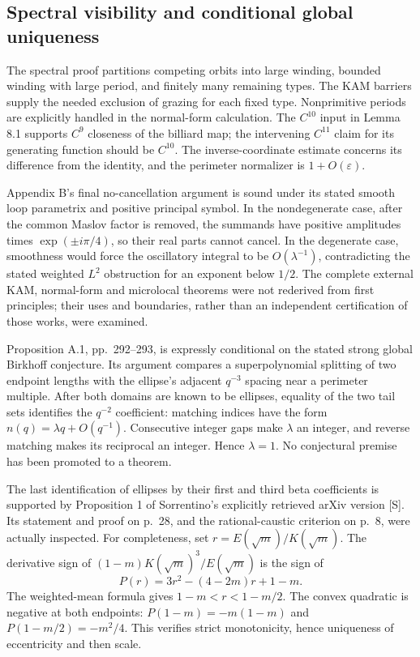 \documentclass[10pt]{article}
\begin{document}
\subsection*{Spectral visibility and conditional global uniqueness}
The spectral proof partitions competing orbits into large winding, bounded winding with large period, and finitely many remaining types. The KAM barriers supply the needed exclusion of grazing for each fixed type. Nonprimitive periods are explicitly handled in the normal-form calculation. The \(C^{10}\) input in Lemma 8.1 supports \(C^9\) closeness of the billiard map; the intervening \(C^{11}\) claim for its generating function should be \(C^{10}\). The inverse-coordinate estimate concerns its difference from the identity, and the perimeter normalizer is \(1+O(\varepsilon)\).\par
Appendix B’s final no-cancellation argument is sound under its stated smooth loop parametrix and positive principal symbol. In the nondegenerate case, after the common Maslov factor is removed, the summands have positive amplitudes times \(\exp(\pm i\pi/4)\), so their real parts cannot cancel. In the degenerate case, smoothness would force the oscillatory integral to be \(O(\lambda^{-1})\), contradicting the stated weighted \(L^2\) obstruction for an exponent below \(1/2\). The complete external KAM, normal-form and microlocal theorems were not rederived from first principles; their uses and boundaries, rather than an independent certification of those works, were examined.\par
Proposition A.1, pp. 292–293, is expressly conditional on the stated strong global Birkhoff conjecture. Its argument compares a superpolynomial splitting of two endpoint lengths with the ellipse’s adjacent \(q^{-3}\) spacing near a perimeter multiple. After both domains are known to be ellipses, equality of the two tail sets identifies the \(q^{-2}\) coefficient: matching indices have the form \(n(q)=\lambda q+O(q^{-1})\). Consecutive integer gaps make \(\lambda\) an integer, and reverse matching makes its reciprocal an integer. Hence \(\lambda=1\). No conjectural premise has been promoted to a theorem.\par
The last identification of ellipses by their first and third beta coefficients is supported by Proposition 1 of Sorrentino’s explicitly retrieved arXiv version [S]. Its statement and proof on p. 28, and the rational-caustic criterion on p. 8, were actually inspected. For completeness, set \(r=E(\sqrt m)/K(\sqrt m)\). The derivative sign of \((1-m)K(\sqrt m)^3/E(\sqrt m)\) is the sign of \[P(r)=3r^2-(4-2m)r+1-m .\] The weighted-mean formula gives \(1-m<r<1-m/2\). The convex quadratic is negative at both endpoints: \(P(1-m)=-m(1-m)\) and \(P(1-m/2)=-m^2/4\). This verifies strict monotonicity, hence uniqueness of eccentricity and then scale.\par
\end{document}
